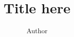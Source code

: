 \documentclass[10pt]{article}
\title{Title here}
\author{Author}
\begin{document}
    \begin{titlepage}
        \centering
        \makeatletter
        \vspace*{1cm}

        \Huge
        \sffamily\textbf{{\@title}}

        ~\vfill

        \Large
        ~\hfill\rmfamily{\@author}

        ~\hfill\@date
    \end{titlepage}
    \newpage
    {\hypersetup{linkcolor=black}\tableofcontents}
    \newpage
%     
    \ifdefined \printbibliography
    \printbibliography
    \fi
\end{document}

